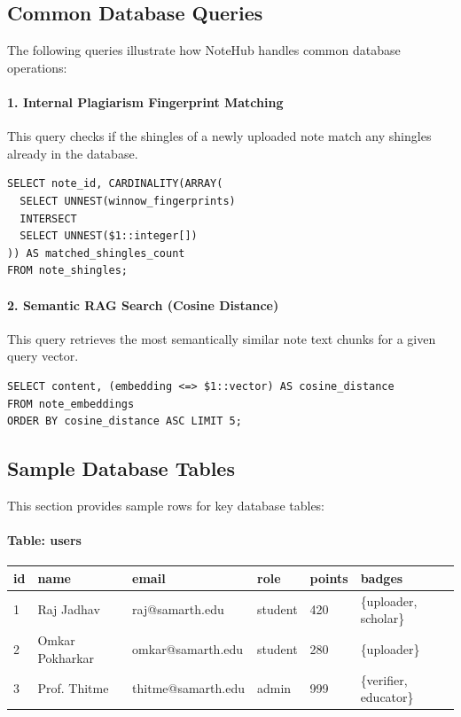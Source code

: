 \documentclass[12,Times new Roman,a4paper]{report}
\begin{document}
\subsection{Common Database Queries}

The following queries illustrate how NoteHub handles common database operations:

\paragraph{1. Internal Plagiarism Fingerprint Matching}
This query checks if the shingles of a newly uploaded note match any shingles already in the database.
\begin{verbatim}
SELECT note_id, CARDINALITY(ARRAY(
  SELECT UNNEST(winnow_fingerprints) 
  INTERSECT 
  SELECT UNNEST($1::integer[])
)) AS matched_shingles_count 
FROM note_shingles;
\end{verbatim}

\paragraph{2. Semantic RAG Search (Cosine Distance)}
This query retrieves the most semantically similar note text chunks for a given query vector.
\begin{verbatim}
SELECT content, (embedding <=> $1::vector) AS cosine_distance 
FROM note_embeddings
ORDER BY cosine_distance ASC LIMIT 5;
\end{verbatim}

\subsection{Sample Database Tables}

This section provides sample rows for key database tables:

\paragraph{Table: users}
\begin{table}[H]
\centering
\begin{tabular}{|l|l|l|l|l|l|}
\hline
\textbf{id} & \textbf{name} & \textbf{email} & \textbf{role} & \textbf{points} & \textbf{badges} \\
\hline
1 & Raj Jadhav & raj@samarth.edu & student & 420 & \{uploader, scholar\} \\
2 & Omkar Pokharkar & omkar@samarth.edu & student & 280 & \{uploader\} \\
3 & Prof. Thitme & thitme@samarth.edu & admin & 999 & \{verifier, educator\} \\
\hline
\end{tabular}
\end{table}
\end{document}
